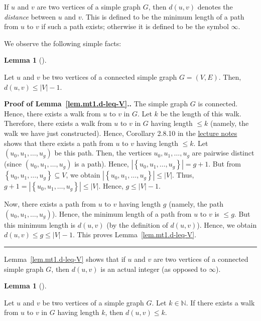 \documentclass[numbers=enddot,12pt,final,onecolumn,notitlepage]{scrartcl}%
\theoremstyle{definition}
\newtheorem{lem}[theo]{Lemma}
\newenvironment{lemma}[1][]
{\begin{lem}[#1]\begin{leftbar}}
{\end{leftbar}\end{lem}}
\newenvironment{proof}[1][Proof]{\noindent\textbf{#1.} }{\ \rule{0.5em}{0.5em}}
\newcommand{\NN}{\mathbb{N}}
\newcommand{\set}[1]{\left\{ #1 \right\}}
\newcommand{\abs}[1]{\left| #1 \right|}
\newcommand{\tup}[1]{\left( #1 \right)}
\begin{document}
If $u$ and $v$ are two vertices of a simple graph $G$, then
$d \tup{u, v}$ denotes the \textit{distance} between $u$ and $v$. This
is defined to be the minimum length of a path from $u$ to $v$ if
such a path exists; otherwise it is defined to be the symbol $\infty$.

We observe the following simple facts:

\begin{lemma} \label{lem.mt1.d-leq-V}
Let $u$ and $v$ be two vertices of a connected simple graph
$G = \tup{V, E}$.
Then, $d \tup{u, v} \leq \abs{V} - 1$.
\end{lemma}

\begin{proof}[Proof of Lemma~\ref{lem.mt1.d-leq-V}.]
The simple graph $G$ is connected. Hence, there exists a walk from $u$
to $v$ in $G$. Let $k$ be the length of this walk. Therefore, there
exists a walk from $u$ to $v$ in $G$ having length $\leq k$ (namely,
the walk we have just constructed).
Hence, Corollary 2.8.10 in the
\href{http://www.cip.ifi.lmu.de/~grinberg/t/17s/nogra.pdf}{lecture notes}
shows that there exists a path from $u$ to $v$ having length
$\leq k$. Let $\tup{u_0, u_1, \ldots, u_g}$ be this path. Then, the
vertices $u_0, u_1, \ldots, u_g$ are pairwise distinct (since
$\tup{u_0, u_1, \ldots, u_g}$ is a path). Hence,
$\abs{\set{u_0, u_1, \ldots, u_g}} = g+1$. But from
$\set{u_0, u_1, \ldots, u_g} \subseteq V$, we obtain
$\abs{\set{u_0, u_1, \ldots, u_g}} \leq \abs{V}$. Thus,
$g + 1 = \abs{\set{u_0, u_1, \ldots, u_g}} \leq \abs{V}$.
Hence, $g \leq \abs{V} - 1$.

Now, there exists a path from $u$ to $v$ having length $g$ (namely,
the path $\tup{u_0, u_1, \ldots, u_g}$). Hence, the minimum length of
a path from $u$ to $v$ is $\leq g$. But this minimum length is
$d \tup{u, v}$ (by the definition of $d \tup{u, v}$). Hence, we obtain
$d \tup{u, v} \leq g \leq \abs{V} - 1$. This proves
Lemma~\ref{lem.mt1.d-leq-V}.
\end{proof}

Lemma~\ref{lem.mt1.d-leq-V} shows that if $u$ and $v$ are two
vertices of a connected simple graph $G$, then $d \tup{u, v}$ is an
actual integer (as opposed to $\infty$).

\begin{lemma} \label{lem.mt1.walk-to-distance}
Let $u$ and $v$ be two vertices of a simple graph $G$. Let
$k \in \NN$. If there exists a walk from $u$ to $v$ in $G$ having
length $k$, then $d \tup{u, v} \leq k$.
\end{lemma}
\end{document}
